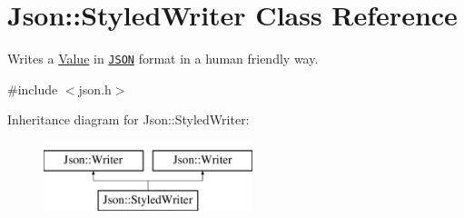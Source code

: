 \hypertarget{class_json_1_1_styled_writer}{}\section{Json\+:\+:Styled\+Writer Class Reference}
\label{class_json_1_1_styled_writer}


Writes a \hyperlink{class_json_1_1_value}{Value} in \href{http://www.json.org}{\tt J\+S\+ON} format in a human friendly way.  




{\ttfamily \#include $<$json.\+h$>$}

Inheritance diagram for Json\+:\+:Styled\+Writer\+:\begin{figure}[H]
\begin{center}
\leavevmode
\includegraphics[height=2.000000cm]{class_json_1_1_styled_writer}
\end{center}
\end{figure}

